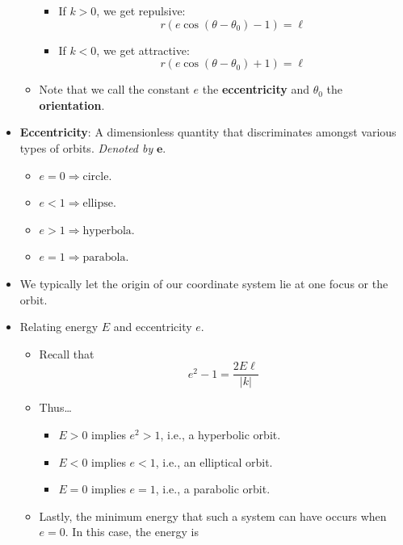 \documentclass[../notes.tex]{subfiles}
\begin{document}
\begin{itemize}
\begin{itemize}
\begin{itemize}
            \item If $k>0$, we get repulsive:
            \begin{equation*}
                r(e\cos(\theta-\theta_0)-1) = \ell
            \end{equation*}
            \item If $k<0$, we get attractive:
            \begin{equation*}
                r(e\cos(\theta-\theta_0)+1) = \ell
            \end{equation*}
        \end{itemize}
        \item Note that we call the constant $e$ the \textbf{eccentricity} and $\theta_0$ the \textbf{orientation}.
    \end{itemize}
    \item \textbf{Eccentricity}: A dimensionless quantity that discriminates amongst various types of orbits. \emph{Denoted by} $\bm{e}$.
    \begin{itemize}
        \item $e=0 \Longrightarrow \text{circle}$.
        \item $e<1 \Longrightarrow \text{ellipse}$.
        \item $e>1 \Longrightarrow \text{hyperbola}$.
        \item $e=1 \Longrightarrow \text{parabola}$.
    \end{itemize}
    \item We typically let the origin of our coordinate system lie at one focus or the orbit.
    \item Relating energy $E$ and eccentricity $e$.
    \begin{itemize}
        \item Recall that
        \begin{equation*}
            e^2-1 = \frac{2E\ell}{|k|}
        \end{equation*}
        \item Thus\dots
        \begin{itemize}
            \item $E>0$ implies $e^2>1$, i.e., a hyperbolic orbit.
            \item $E<0$ implies $e<1$, i.e., an elliptical orbit.
            \item $E=0$ implies $e=1$, i.e., a parabolic orbit.
        \end{itemize}
        \item Lastly, the minimum energy that such a system can have occurs when $e=0$. In this case, the energy is

\end{itemize}
\end{itemize}
\end{document}

